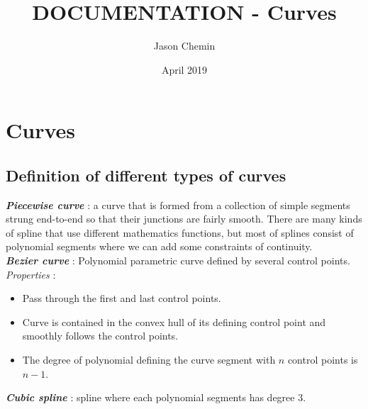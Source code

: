 \documentclass{article}
\title{DOCUMENTATION - Curves}
\author{Jason Chemin}
\date{April 2019}
\begin{document}
\newcommand{\commentt}[2]{\textcolor{#1}{\textbf{\textit{[#2]}}}}       %
\newcommand{\nmnote}[1]{\commentt{red}{NM: #1}}
\newcommand{\stn}[1]{\commentt{blue}{ST: #1}}

\maketitle
 
\tableofcontents
\newpage

\section{Curves}
\subsection{Definition of different types of curves}

    
    \noindent
    \textbf{\textit{Piecewise curve}} : a curve that is formed from a collection of simple segments strung end-to-end so that their junctions are fairly smooth. There are many kinds of spline that use different mathematics functions, but most of splines consist of polynomial segments where we can add some constraints of continuity.\\
    
    \noindent
    \textbf{\textit{Bezier curve}} : Polynomial parametric curve defined by several control points. \textit{Properties} :
    \begin{itemize}
        \item Pass through the first and last control points.
        \item Curve is contained in the convex hull of its defining control point and smoothly follows the control points.
        \item The degree of polynomial defining the curve segment with $n$ control points is $n-1$.
    \end{itemize}
    
    \noindent
    \textbf{\textit{Cubic spline}} : spline where each polynomial segments has degree 3.\\
    
\end{document}
